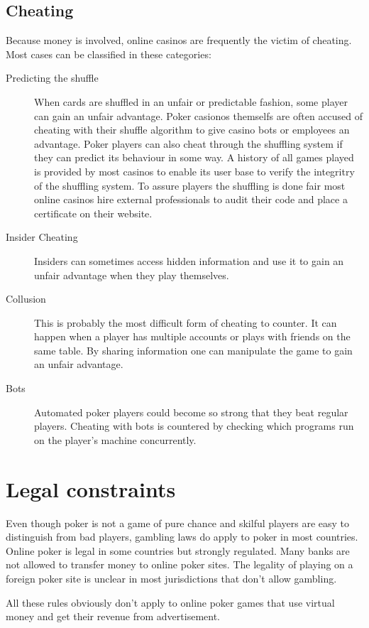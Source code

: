 \documentclass[a4paper,11pt]{report}
\begin{document}
\subsection{Cheating}
Because money is involved, online casinos are frequently the victim of cheating. Most cases can be classified in these categories:
\begin{description}
 \item[Predicting the shuffle] When cards are shuffled in an unfair or predictable fashion, some player can gain an unfair advantage. Poker casionos themselfs are often accused of cheating with their shuffle algorithm to give casino bots or employees an advantage. Poker players can also cheat through the shuffling system if they can predict its behaviour in some way. A history of all games played is provided by most casinos to enable its user base to verify the integritry of the shuffling system. To assure players the shuffling is done fair most online casinos hire external professionals to audit their code and place a certificate on their website. 
 \item[Insider Cheating] Insiders can sometimes access hidden information and use it to gain an unfair advantage when they play themselves.
 \item[Collusion] This is probably the most difficult form of cheating to counter. It can happen when a player has multiple accounts or plays with friends on the same table. By sharing information one can manipulate the game to gain an unfair advantage.
\item[Bots] Automated poker players could become so strong that they beat regular players. Cheating with bots is countered by checking which programs run on the player's machine concurrently.
 \end{description}

\section{Legal constraints}
Even though poker is not a game of pure chance and skilful players are easy to distinguish from bad players, gambling laws do apply to poker in most countries. Online poker is legal in some countries but strongly regulated. Many banks are not allowed to transfer money to online poker sites. The legality of playing on a foreign poker site is unclear in most jurisdictions that don't allow gambling.

All these rules obviously don't apply to online poker games that use virtual money and get their revenue from advertisement.
\end{document}
